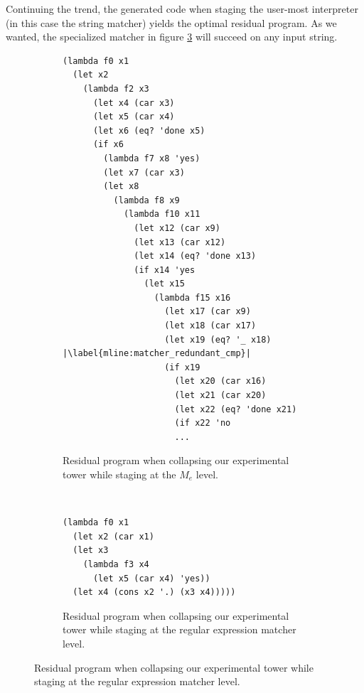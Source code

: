 \documentclass[a4paper,12pt,twoside,openright]{report}
\theoremstyle{definition}
\newcommand{\mevl}{$M_{e}$}
\begin{document}
Continuing the trend, the generated code when staging the user-most interpreter (in this case the string matcher) yields the optimal residual program. As we wanted, the specialized matcher in figure \ref{lst:mevl_regexp_staged} will succeed on any input string.

\begin{figure}[htp!]
\centering
    \begin{subfigure}{\linewidth}
        \centering
        \begin{verbatim}
(lambda f0 x1
  (let x2
    (lambda f2 x3
      (let x4 (car x3)
      (let x5 (car x4)
      (let x6 (eq? 'done x5)
      (if x6
        (lambda f7 x8 'yes)
        (let x7 (car x3)
        (let x8
          (lambda f8 x9
            (lambda f10 x11
              (let x12 (car x9)
              (let x13 (car x12)
              (let x14 (eq? 'done x13)
              (if x14 'yes
                (let x15
                  (lambda f15 x16
                    (let x17 (car x9)
                    (let x18 (car x17)
                    (let x19 (eq? '_ x18) |\label{mline:matcher_redundant_cmp}|
                    (if x19
                      (let x20 (car x16)
                      (let x21 (car x20)
                      (let x22 (eq? 'done x21)
                      (if x22 'no
                      ...
        \end{verbatim}
        \caption{Residual program when collapsing our experimental tower while staging at the \mevl{} level.}
        \label{lst:mevl_staged_regexp}
    \end{subfigure}
    \\[1ex]
    \par\bigskip
    \begin{subfigure}{\linewidth}
        \centering
        \begin{verbatim}
(lambda f0 x1
  (let x2 (car x1)
  (let x3
    (lambda f3 x4
      (let x5 (car x4) 'yes))
  (let x4 (cons x2 '.) (x3 x4)))))
        \end{verbatim}
        \caption{Residual program when collapsing our experimental tower while staging at the regular expression matcher level.}
        \label{lst:mevl_regexp_staged}
    \end{subfigure}
\end{figure}
\pagebreak
\end{document}

